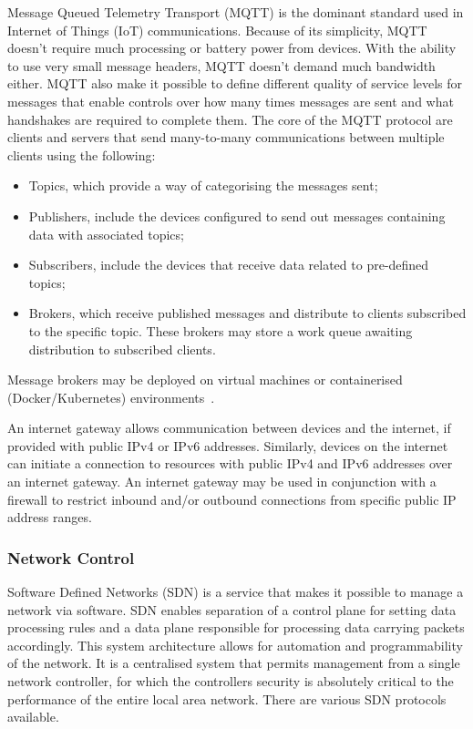 \documentclass[11pt, oneside]{book}   	%
\begin{document}
Message Queued Telemetry Transport (MQTT) is the dominant standard used in Internet of Things (IoT) communications.
Because of its simplicity, MQTT doesn’t require much processing or battery power from devices.
With the ability to use very small message headers, MQTT doesn’t demand much bandwidth either.
MQTT also make it possible to define different quality of service levels for messages that enable controls over how many times messages are sent and what handshakes are required to complete them.
The core of the MQTT protocol are clients and servers that send many-to-many communications between multiple clients using the following:
\begin{itemize}
	\item Topics, which provide a way of categorising the messages sent; 
	\item Publishers, include the devices configured to send out messages containing data with associated topics;
	\item Subscribers, include the devices that receive data related to pre-defined topics;
	\item Brokers, which receive published messages and distribute to clients subscribed to the specific topic. These brokers may store a work queue awaiting distribution to subscribed clients.
\end{itemize}
Message brokers may be deployed on virtual machines or containerised (Docker/Kubernetes) environments~\cite{mqtt}.\

An internet gateway allows communication between devices and the internet, if provided with public IPv4 or IPv6 addresses.
Similarly, devices on the internet can initiate a connection to resources with public IPv4 and IPv6 addresses over an internet gateway.
An internet gateway may be used in conjunction with a firewall to restrict inbound and/or outbound connections from specific public IP address ranges.\

\subsubsection{Network Control}
Software Defined Networks (SDN) is a service that makes it possible to manage a network via software.
SDN enables separation of a control plane for setting data processing rules and a data plane responsible for processing data carrying packets accordingly.
This system architecture allows for automation and programmability of the network.
It is a centralised system that permits management from a single network controller, for which the controllers security is absolutely critical to the performance of the entire local area network.
There are various SDN protocols available.\
\end{document}
